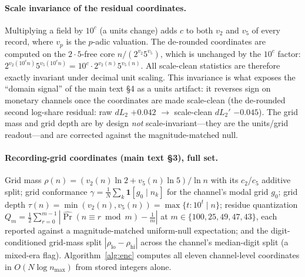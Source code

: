 \documentclass[12pt]{article}
\newcommand{\rmass}{\rho}
\newcommand{\gdepth}{\tau}
\begin{document}
\paragraph{Scale invariance of the residual coordinates.}
Multiplying a field by $10^c$ (a units change) adds $c$ to both $v_2$ and
$v_5$ of every record, where $v_p$ is the $p$-adic valuation. The de-rounded
coordinates are computed on the $2\cdot5$-free core $n / (2^{v_2} 5^{v_5})$,
which is unchanged by the $10^c$ factor:
$2^{v_2(10^c n)} 5^{v_5(10^c n)} = 10^c \cdot 2^{v_2(n)} 5^{v_5(n)}$. All
scale-clean statistics are therefore exactly invariant under decimal unit
scaling. This invariance is what exposes the ``domain signal'' of the main
text \S4 as a units artifact: it reverses sign on monetary channels once the
coordinates are made scale-clean (the de-rounded second log-share residual: raw $dL_2$ $+0.042$ $\to$
scale-clean $dL_2'$ $-0.045$). The grid mass and grid depth are by design \emph{not}
scale-invariant---they are the units/grid readout---and are corrected against
the magnitude-matched null.

\paragraph{Recording-grid coordinates (main text \S3), full set.}
Grid mass $\rmass(n) = (v_2(n)\ln 2 + v_5(n)\ln 5)/\ln n$ with its
$c_2$/$c_5$ additive split; grid conformance
$\gamma = \frac1N \sum_k \mathbf{1}[g_0 \mid n_k]$ for the channel's modal
grid $g_0$; grid depth
$\gdepth(n) = \min(v_2(n), v_5(n)) = \max\{t : 10^t \mid n\}$; residue
quantization $Q_m = \frac12 \sum_{r=0}^{m-1}
|\widehat{\Pr}(n \equiv r \bmod m) - \frac1m|$ at
$m \in \{100, 25, 49, 47, 43\}$, each reported against a magnitude-matched
uniform-null expectation; and the digit-conditioned grid-mass split
$|\rmass_{\mathrm{lo}} - \rmass_{\mathrm{hi}}|$ across the channel's
median-digit split (a mixed-era flag). Algorithm~\ref{alg:enc} computes all
eleven channel-level coordinates in $O(N \log n_{\max})$ from stored integers
alone.
\end{document}
